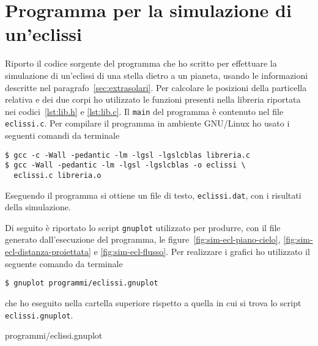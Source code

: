 \clearpage{}
\chapter{Programma per la simulazione di un'eclissi}
\label{cha:simulazione-eclissi}

Riporto il codice sorgente del programma che ho scritto per effettuare la
simulazione di un'eclissi di una stella dietro a un pianeta, usando le
informazioni descritte nel paragrafo~\ref{sec:extrasolari}. Per calcolare le
posizioni della particella relativa e dei due corpi ho utilizzato le funzioni
presenti nella libreria riportata nei codici~\ref{lst:lib.h} e
\ref{lst:lib.c}. Il \verb|main| del programma è contenuto nel file
\verb|eclissi.c|. Per compilare il programma in ambiente GNU/Linux ho usato i
seguenti comandi da terminale
\begin{verbatim}
$ gcc -c -Wall -pedantic -lm -lgsl -lgslcblas libreria.c
$ gcc -Wall -pedantic -lm -lgsl -lgslcblas -o eclissi \
  eclissi.c libreria.o
\end{verbatim}
Eseguendo il programma si ottiene un file di testo, \verb|eclissi.dat|, con i
risultati della simulazione.
% 

Di seguito è riportato lo script \verb|gnuplot| utilizzato per produrre, con il
file generato dall'esecuzione del programma, le
figure~\ref{fig:sim-ecl-piano-cielo}, \ref{fig:sim-ecl-distanza-proiettata} e
\ref{fig:sim-ecl-flusso}. Per realizzare i grafici ho utilizzato il seguente
comando da terminale
\begin{verbatim}
$ gnuplot programmi/eclissi.gnuplot
\end{verbatim}
che ho eseguito nella cartella superiore rispetto a quella in cui si trova lo
script \verb|eclissi.gnuplot|.

{programmi/eclissi.gnuplot}

